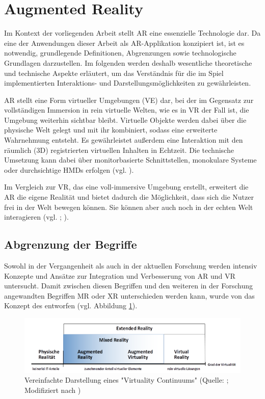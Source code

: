\section{Augmented Reality}
Im Kontext der vorliegenden Arbeit stellt \ac{AR} eine essenzielle Technologie dar. Da eine der Anwendungen dieser Arbeit als \ac{AR}-Applikation konzipiert ist, ist es notwendig, grundlegende Definitionen, Abgrenzungen sowie technologische Grundlagen darzustellen. Im folgenden werden deshalb wesentliche theoretische und technische Aspekte erläutert, um das Verständnis für die im Spiel implementierten Interaktions- und Darstellungsmöglichkeiten zu gewährleisten.

\ac{AR} stellt eine Form virtueller Umgebungen (\ac{VE}) dar, bei der im Gegensatz zur vollständigen Immersion in rein virtuelle Welten, wie es in \ac{VR} der Fall ist, die Umgebung weiterhin sichtbar bleibt. Virtuelle Objekte werden dabei über die physische Welt gelegt und mit ihr kombiniert, sodass eine erweiterte Wahrnehmung entsteht. Es gewährleistet außerdem eine Interaktion mit den räumlich (\ac{3D}) registrierten virtuellen Inhalten in Echtzeit. Die technische Umsetzung kann dabei über monitorbasierte Schnittstellen, monokulare Systeme oder durchsichtige \ac{HMD}s erfolgen (vgl. \cite[S. 2f]{azuma_survey_1997}).

Im Vergleich zur \ac{VR}, das eine voll-immersive Umgebung erstellt, erweitert die \ac{AR} die eigene Realität und bietet dadurch die Möglichkeit, dass sich die Nutzer frei in der Welt bewegen können. Sie können aber auch noch in der echten Welt interagieren (vgl. \citealp[S. 79]{billinghurst_survey_2015}; \citealp[S. 1]{stefanidi_meaningful_2024}).

\subsection{Abgrenzung der Begriffe}
Sowohl in der Vergangenheit als auch in der aktuellen Forschung werden intensiv Konzepte und Ansätze zur Integration und Verbesserung von \ac{AR} und \ac{VR} untersucht. Damit zwischen diesen Begriffen und den weiteren in der Forschung angewandten Begriffen \ac{MR} oder \ac{XR} unterschieden werden kann, wurde von  \cite{milgram_taxonomy_1994} das Konzept des  entworfen (vgl. Abbildung \ref{fig:virtuality-continuum}).

\begin{figure}[ht]
\centering
\includegraphics[width=1\linewidth]{content/pictures/virtuality-continuum_upscaled.PNG}
\caption{Vereinfachte Darstellung eines "Virtuality Continuums" (Quelle: \citealp[S. 9]{knoll_augmented_2022}; Modifiziert nach \citealp[S. 3]{milgram_taxonomy_1994})}
\label{fig:virtuality-continuum}
\end{figure}


